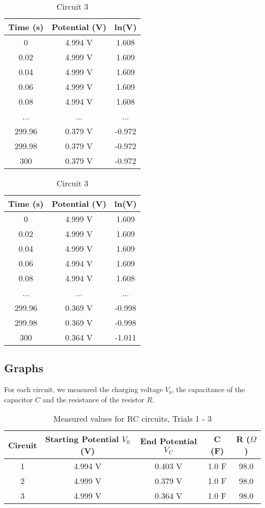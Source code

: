 \documentclass[12pt]{article}
\begin{document}
\begin{table}
\parbox{.45\linewidth}{
\centering
\begin{tabular}{||ccc||}
\hline
Time (s) & Potential (V) & ln(V) \\ [0.5ex] 
\hline
 0 & 4.994 V & 1.608  \\ 
 0.02 & 4.999 V & 1.609  \\
 0.04 & 4.999 V & 1.609  \\ 
 0.06 & 4.999 V & 1.609  \\
 0.08 & 4.994 V & 1.608  \\ 
 ... & ... & ... \\
 299.96 & 0.379 V & -0.972  \\ 
 299.98 & 0.379 V & -0.972 \\
 300 & 0.379 V & -0.972  \\ 
\hline
\end{tabular}
\caption{Circuit 2}
}
\hfill
\parbox{.45\linewidth}{
\centering
\begin{tabular}{||ccc||}
\hline
Time (s) & Potential (V) & ln(V) \\ [0.5ex] 
\hline
 0 & 4.999 V & 1.609  \\ 
 0.02 & 4.999 V & 1.609 \\
 0.04 & 4.999 V & 1.609  \\ 
 0.06 & 4.994 V & 1.609 \\
 0.08 & 4.994 V & 1.608  \\ 
 ... &  ... & ... \\
 299.96 & 0.369 V & -0.998  \\ 
 299.98 & 0.369 V & -0.998 \\
 300 & 0.364 V & -1.011  \\ 
\hline
\end{tabular}
\caption{Circuit 3}
}
\end{table}

\pagebreak
\subsection*{Graphs}

For each circuit, we measured the charging voltage $V_b$, the capacitance of the capacitor $C$ and the resistance of the resistor $R$.

\begin{table}[h!]
\centering
\begin{tabular}{||c c c c c||}
 \hline
Circuit & Starting Potential $V_0$ (V) & End Potential $V_C$ & C (F) & R ($\Omega$) \\ [0.5ex] 
 \hline\hline
 1 & 4.994 V & 0.403 V & 1.0 F & 98.0 \\ 
 2 & 4.999 V & 0.379 V & 1.0 F & 98.0 \\
 3 & 4.999 V & 0.364 V & 1.0 F & 98.0 \\ 
 \hline
\end{tabular}
\caption{Measured values for RC circuits, Trials 1 - 3}
\label{table:1}
\end{table}
\end{document}
